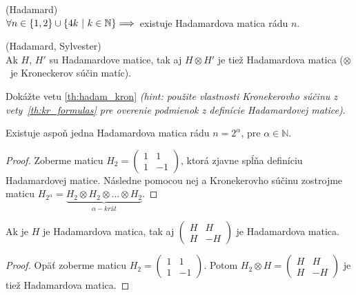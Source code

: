\begin{hypothesis}{(Hadamard)}\\
$\forall n \in \left\{1, 2\right\} \cup \left\{4k ~|~ k \in \mathbb{N}\right\} \Longrightarrow$~existuje Hadamardova matica rádu $n$. 
\end{hypothesis}


\begin{theorem}{(Hadamard, Sylvester)}\\
\label{th:hadam_kron}
Ak $H$, $H'$ su Hadamardove matice, tak aj $H \otimes H'$ je tiež Hadamardova matica ($\otimes$~je Kroneckerov súčin matíc).
\end{theorem}

\begin{exercise}
Dokážte vetu \ref{th:hadam_kron} \emph{(hint: použite vlastnosti Kronekerovho súčinu z vety~\ref{th:kr_formulas} pre overenie podmienok z definície Hadamardovej matice)}.
\end{exercise}

\begin{corollary}
Existuje aspoň jedna Hadamardova matica rádu $n = 2^\alpha$, pre $\alpha \in \mathbb{N}$.
\end{corollary}

\begin{proof}
Zoberme maticu 
$ H_2 = \begin{pmatrix}
	1 & 1\\
	1 & -1
\end{pmatrix}$, ktorá zjavne spĺňa definíciu Hadamardovej matice.
Následne pomocou nej a Kronekerovho súčinu zostrojme maticu $ H_{2^\alpha} = \underbrace {H_2 \otimes H_2 \otimes \ldots \otimes H_2}_{\alpha - krát}$.
\end{proof}

\begin{corollary}
Ak je $H$ je Hadamardova matica, tak aj 
$ \begin{pmatrix}
	H & H\\
	H & -H
\end{pmatrix}$
je Hadamardova matica.
\end{corollary}

\begin{proof}
Opäť zoberme maticu
$ H_2 = \begin{pmatrix}
	1 & 1\\
	1 & -1
\end{pmatrix}$.
Potom $H_2 \otimes H = \begin{pmatrix}
	H & H\\
	H & -H
\end{pmatrix}$ je tiež Hadamardova matica.
\end{proof}

